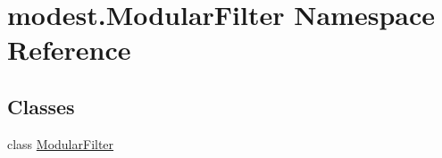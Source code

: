 \hypertarget{namespacemodest_1_1ModularFilter}{}\section{modest.\+Modular\+Filter Namespace Reference}
\label{namespacemodest_1_1ModularFilter}
\subsection*{Classes}
\begin{DoxyCompactItemize}
\item 
class \hyperlink{classmodest_1_1ModularFilter_1_1ModularFilter}{Modular\+Filter}
\end{DoxyCompactItemize}
